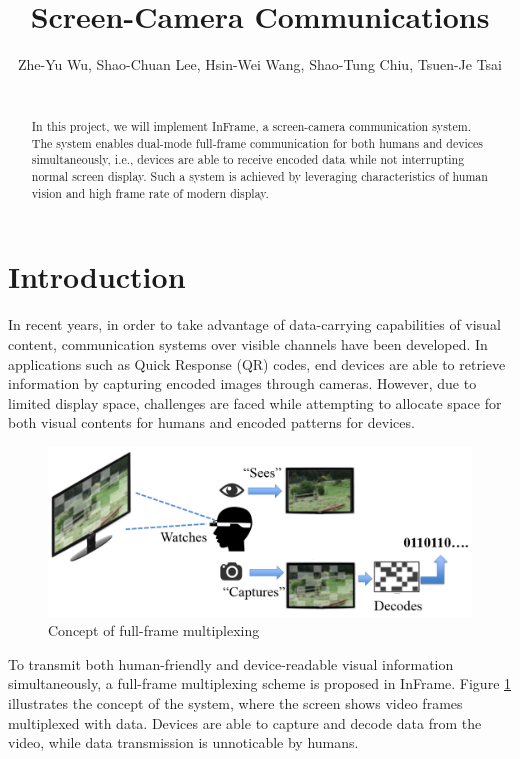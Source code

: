 \documentclass{acm_proc_article-sp}
\title{Screen-Camera Communications}
\subtitle{}
\author{
    Zhe-Yu Wu, Shao-Chuan Lee, Hsin-Wei Wang, Shao-Tung Chiu, Tsuen-Je Tsai \\
    \affaddr{B02902125, B01902010, B01902048, B01902085, B01902138} \\
    \email{\{B02902125, B01902010, B01902048, B01902085, B01902138\}@csie.ntu.edu.tw}
}
\begin{document}
\maketitle

\begin{abstract}
In this project, we will implement InFrame\cite{conf/hotnets/0002PZSZ14}, a screen-camera communication system. The system enables dual-mode full-frame communication for both humans and devices simultaneously, i.e., devices are able to receive encoded data while not interrupting normal screen display. Such a system is achieved by leveraging characteristics of human vision and high frame rate of modern display.
\end{abstract}

\section{Introduction}
In recent years, in order to take advantage of data-carrying capabilities of visual content, communication systems over visible channels have been developed. In applications such as Quick Response (QR) codes, end devices are able to retrieve information by capturing encoded images through cameras. However, due to limited display space, challenges are faced while attempting to allocate space for both visual contents for humans and encoded patterns for devices.

\begin{figure}[!h]
    \centering
    \includegraphics[width=\linewidth]{figures/concept}
    \caption{Concept of full-frame multiplexing}
    \label{fig:concept}
\end{figure}

To transmit both human-friendly and device-readable visual information simultaneously, a full-frame multiplexing scheme is proposed in InFrame. Figure \ref{fig:concept} illustrates the concept of the system, where the screen shows video frames multiplexed with data. Devices are able to capture and decode data from the video, while data transmission is unnoticable by humans.
\end{document}
